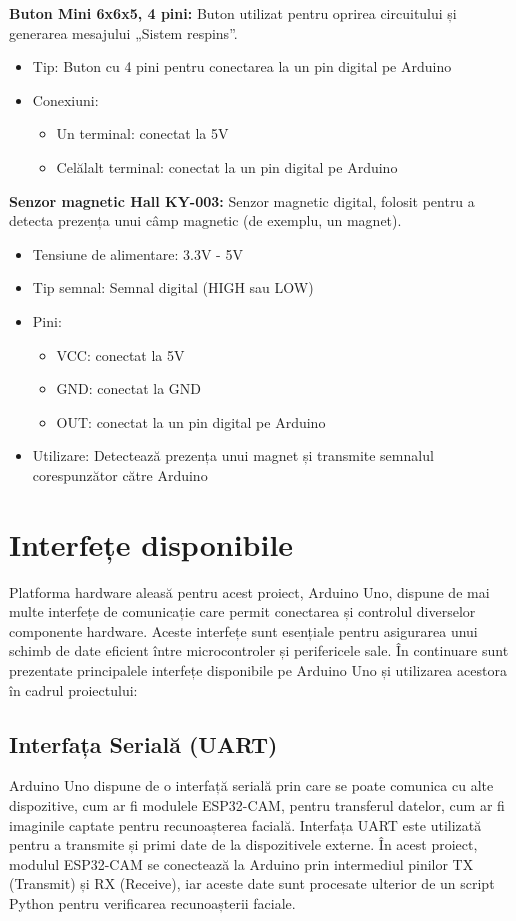 \documentclass[a4paper,12pt]{report}
\begin{document}
\textbf{Buton Mini 6x6x5, 4 pini:} Buton utilizat pentru oprirea circuitului și generarea mesajului „Sistem respins”.
\begin{itemize}
    \item Tip: Buton cu 4 pini pentru conectarea la un pin digital pe Arduino
    \item Conexiuni:
    \begin{itemize}
        \item Un terminal: conectat la 5V
        \item Celălalt terminal: conectat la un pin digital pe Arduino
    \end{itemize}
\end{itemize}

\textbf{Senzor magnetic Hall KY-003:} Senzor magnetic digital, folosit pentru a detecta prezența unui câmp magnetic (de exemplu, un magnet).
\begin{itemize}
    \item Tensiune de alimentare: 3.3V - 5V
    \item Tip semnal: Semnal digital (HIGH sau LOW)
    \item Pini:
    \begin{itemize}
        \item VCC: conectat la 5V
        \item GND: conectat la GND
        \item OUT: conectat la un pin digital pe Arduino
    \end{itemize}
    \item Utilizare: Detectează prezența unui magnet și transmite semnalul corespunzător către Arduino
\end{itemize}



\section{Interfețe disponibile}

Platforma hardware aleasă pentru acest proiect, Arduino Uno, dispune de mai multe interfețe de comunicație care permit conectarea și controlul diverselor componente hardware. Aceste interfețe sunt esențiale pentru asigurarea unui schimb de date eficient între microcontroler și perifericele sale. În continuare sunt prezentate principalele interfețe disponibile pe Arduino Uno și utilizarea acestora în cadrul proiectului:

\subsection{Interfața Serială (UART)}
Arduino Uno dispune de o interfață serială prin care se poate comunica cu alte dispozitive, cum ar fi modulele ESP32-CAM, pentru transferul datelor, cum ar fi imaginile captate pentru recunoașterea facială. Interfața UART este utilizată pentru a transmite și primi date de la dispozitivele externe. În acest proiect, modulul ESP32-CAM se conectează la Arduino prin intermediul pinilor TX (Transmit) și RX (Receive), iar aceste date sunt procesate ulterior de un script Python pentru verificarea recunoașterii faciale.
\end{document}
